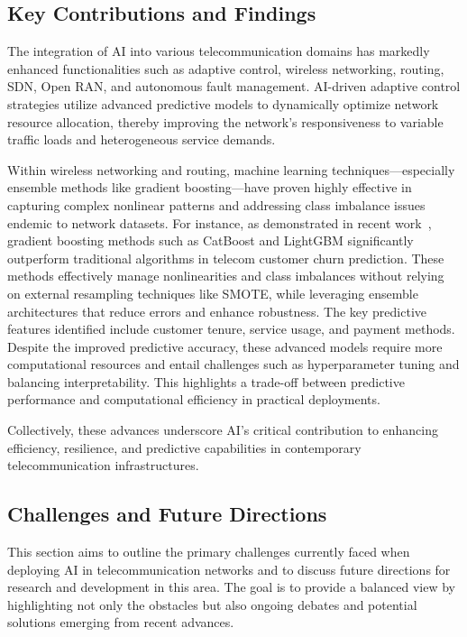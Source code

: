 \documentclass[sigconf]{acmart}
\begin{document}
\subsection{Key Contributions and Findings}

The integration of AI into various telecommunication domains has markedly enhanced functionalities such as adaptive control, wireless networking, routing, SDN, Open RAN, and autonomous fault management. AI-driven adaptive control strategies utilize advanced predictive models to dynamically optimize network resource allocation, thereby improving the network’s responsiveness to variable traffic loads and heterogeneous service demands.

Within wireless networking and routing, machine learning techniques—especially ensemble methods like gradient boosting—have proven highly effective in capturing complex nonlinear patterns and addressing class imbalance issues endemic to network datasets. For instance, as demonstrated in recent work~\cite{ref17}, gradient boosting methods such as CatBoost and LightGBM significantly outperform traditional algorithms in telecom customer churn prediction. These methods effectively manage nonlinearities and class imbalances without relying on external resampling techniques like SMOTE, while leveraging ensemble architectures that reduce errors and enhance robustness. The key predictive features identified include customer tenure, service usage, and payment methods. Despite the improved predictive accuracy, these advanced models require more computational resources and entail challenges such as hyperparameter tuning and balancing interpretability. This highlights a trade-off between predictive performance and computational efficiency in practical deployments.

Collectively, these advances underscore AI’s critical contribution to enhancing efficiency, resilience, and predictive capabilities in contemporary telecommunication infrastructures.

\subsection{Challenges and Future Directions}

This section aims to outline the primary challenges currently faced when deploying AI in telecommunication networks and to discuss future directions for research and development in this area. The goal is to provide a balanced view by highlighting not only the obstacles but also ongoing debates and potential solutions emerging from recent advances.
\end{document}
